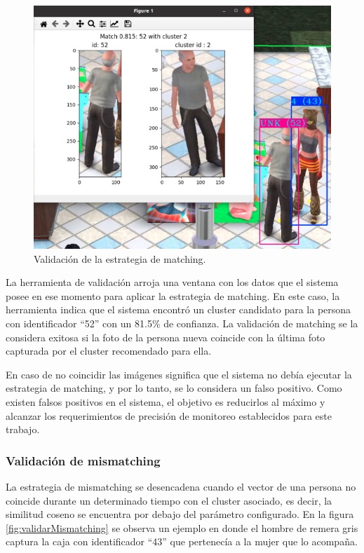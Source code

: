 \begin{figure}[ht]
	\centering
	\includegraphics[scale=.7]{./Figures/validarMatching.png}
	\caption{Validación de la estrategia de matching.}
	\label{fig:validarMatching}
\end{figure}

La herramienta de validación arroja una ventana con los datos que el sistema posee en ese momento para aplicar la estrategia de matching. En este caso, la herramienta indica que el sistema encontró un cluster candidato para la persona con identificador ``52'' con un 81.5\% de confianza. La validación de matching se la considera exitosa si la foto de la persona nueva coincide con la última foto capturada por el cluster recomendado para ella. 

En caso de no coincidir las imágenes significa que el sistema no debía ejecutar la estrategia de matching, y por lo tanto, se lo considera un falso positivo. Como existen falsos positivos en el sistema, el objetivo es reducirlos al máximo y alcanzar los requerimientos de precisión de monitoreo establecidos para este trabajo.

\newpage

\subsubsection{Validación de mismatching}

La estrategia de mismatching se desencadena cuando el vector de una persona no coincide durante un determinado tiempo con el cluster asociado, es decir, la similitud coseno se encuentra por debajo del parámetro configurado. En la figura \ref{fig:validarMismatching} se observa un ejemplo en donde el hombre de remera gris captura la caja con identificador ``43'' que pertenecía a la mujer que lo acompaña.

